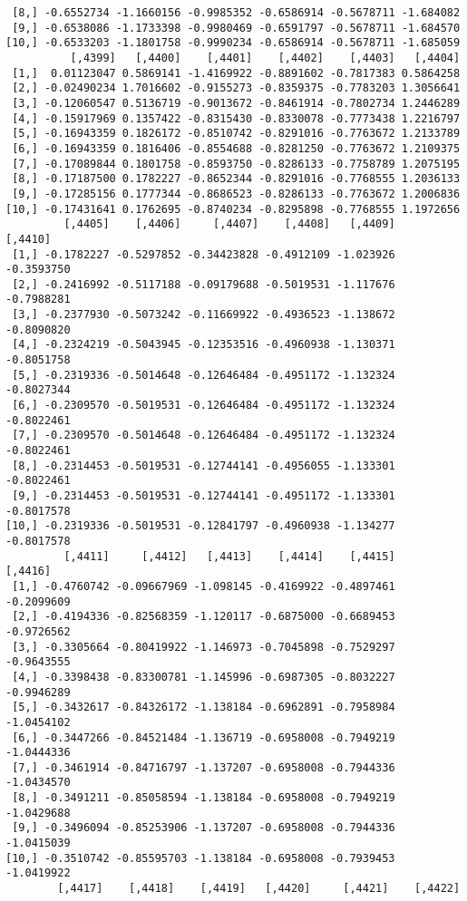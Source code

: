 \documentclass[
  letterpaper,
  DIV=11,
  numbers=noendperiod]{scrreprt}
\begin{document}
\begin{verbatim}
 [8,] -0.6552734 -1.1660156 -0.9985352 -0.6586914 -0.5678711 -1.684082
 [9,] -0.6538086 -1.1733398 -0.9980469 -0.6591797 -0.5678711 -1.684570
[10,] -0.6533203 -1.1801758 -0.9990234 -0.6586914 -0.5678711 -1.685059
          [,4399]   [,4400]    [,4401]    [,4402]    [,4403]   [,4404]
 [1,]  0.01123047 0.5869141 -1.4169922 -0.8891602 -0.7817383 0.5864258
 [2,] -0.02490234 1.7016602 -0.9155273 -0.8359375 -0.7783203 1.3056641
 [3,] -0.12060547 0.5136719 -0.9013672 -0.8461914 -0.7802734 1.2446289
 [4,] -0.15917969 0.1357422 -0.8315430 -0.8330078 -0.7773438 1.2216797
 [5,] -0.16943359 0.1826172 -0.8510742 -0.8291016 -0.7763672 1.2133789
 [6,] -0.16943359 0.1816406 -0.8554688 -0.8281250 -0.7763672 1.2109375
 [7,] -0.17089844 0.1801758 -0.8593750 -0.8286133 -0.7758789 1.2075195
 [8,] -0.17187500 0.1782227 -0.8652344 -0.8291016 -0.7768555 1.2036133
 [9,] -0.17285156 0.1777344 -0.8686523 -0.8286133 -0.7763672 1.2006836
[10,] -0.17431641 0.1762695 -0.8740234 -0.8295898 -0.7768555 1.1972656
         [,4405]    [,4406]     [,4407]    [,4408]   [,4409]    [,4410]
 [1,] -0.1782227 -0.5297852 -0.34423828 -0.4912109 -1.023926 -0.3593750
 [2,] -0.2416992 -0.5117188 -0.09179688 -0.5019531 -1.117676 -0.7988281
 [3,] -0.2377930 -0.5073242 -0.11669922 -0.4936523 -1.138672 -0.8090820
 [4,] -0.2324219 -0.5043945 -0.12353516 -0.4960938 -1.130371 -0.8051758
 [5,] -0.2319336 -0.5014648 -0.12646484 -0.4951172 -1.132324 -0.8027344
 [6,] -0.2309570 -0.5019531 -0.12646484 -0.4951172 -1.132324 -0.8022461
 [7,] -0.2309570 -0.5014648 -0.12646484 -0.4951172 -1.132324 -0.8022461
 [8,] -0.2314453 -0.5019531 -0.12744141 -0.4956055 -1.133301 -0.8022461
 [9,] -0.2314453 -0.5019531 -0.12744141 -0.4951172 -1.133301 -0.8017578
[10,] -0.2319336 -0.5019531 -0.12841797 -0.4960938 -1.134277 -0.8017578
         [,4411]     [,4412]   [,4413]    [,4414]    [,4415]    [,4416]
 [1,] -0.4760742 -0.09667969 -1.098145 -0.4169922 -0.4897461 -0.2099609
 [2,] -0.4194336 -0.82568359 -1.120117 -0.6875000 -0.6689453 -0.9726562
 [3,] -0.3305664 -0.80419922 -1.146973 -0.7045898 -0.7529297 -0.9643555
 [4,] -0.3398438 -0.83300781 -1.145996 -0.6987305 -0.8032227 -0.9946289
 [5,] -0.3432617 -0.84326172 -1.138184 -0.6962891 -0.7958984 -1.0454102
 [6,] -0.3447266 -0.84521484 -1.136719 -0.6958008 -0.7949219 -1.0444336
 [7,] -0.3461914 -0.84716797 -1.137207 -0.6958008 -0.7944336 -1.0434570
 [8,] -0.3491211 -0.85058594 -1.138184 -0.6958008 -0.7949219 -1.0429688
 [9,] -0.3496094 -0.85253906 -1.137207 -0.6958008 -0.7944336 -1.0415039
[10,] -0.3510742 -0.85595703 -1.138184 -0.6958008 -0.7939453 -1.0419922
        [,4417]    [,4418]    [,4419]   [,4420]     [,4421]    [,4422]

\end{verbatim}
\end{document}
